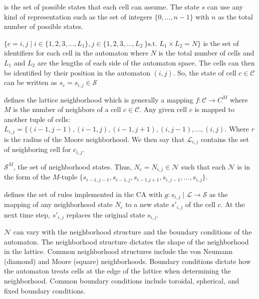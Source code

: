 \begin{CAdef}
    \itemS is the set of possible states that each cell can assume. The state $s$ can use any kind of representation such as the set of integers $\lbrace 0,\ldots,n-1\rbrace$ with $n$ as the total number of possible states.
    
    \itemC $\lbrace c = {i,j} \mid i \in \lbrace 1,2,3,\dots,L_1 \rbrace, j \in \lbrace 1,2,3,\dots,L_2\ \rbrace \text{s.t. } L_1 \times L_2 = N \rbrace$ is the set of identifiers for each cell in the automaton where $N$ is the total number of cells and $L_1$ and $L_2$ are the lengths of each side of the automaton space. The cells can then be identified by their position in the automaton $(i,j)$. So, the state of cell $c \in \mathcal{C}$ can be written as $s_c = s_{i,j} \in \mathcal{S}$
    
    \itemL defines the lattice neighborhood which is generally a mapping $f : \mathcal{C} \rightarrow C^M$ where $M$ is the number of neighbors of a cell $c \in \mathcal{C}$. Any given cell $c$ is mapped to another tuple of cells: $L_{i,j} = \lbrace (i-1,j-1), (i-1, j), (i-1, j+1), (i, j-1), \dots, (i,j)$. Where $r$ is the radius of the Moore neighborhood. We then say that $\mathcal{L}_{i,j}$ contains the set of neighboring cell for $c_{i,j}$.
    
    \itemN $\mathcal{S}^M$, the set of neighborhood states. Thus, $N_c = N_{i,j} \in \mathcal{N}$ such that each $\mathcal{N}$ is in the form of the $M$-tuple $\lbrace s_{i-1,j-1}, s_{i-1, j}, s_{i-1. j+1}, s_{i, j-1}, \dots, s_{i,j} \rbrace$.
    
    \itemR defines the set of rules implemented in the CA with $g : s_{i,j} \mid \mathcal{L} \rightarrow \mathcal{S}$ as the mapping of any neighborhood state $N_c$ to a new state $s'_{i,j}$ of the cell $c$. At the next time step, $s'_{i,j}$ replaces the original state $s_{i,j}$.
\end{CAdef}

$\mathcal{N}$ can vary with the neighborhood structure and the boundary conditions of the automaton. 
The neighborhood structure dictates the shape of the neighborhood in the lattice. 
Common neighborhood structures include the von Neumann (diamond) and Moore (square) neighborhoods. 
Boundary conditions dictate how the automaton treats cells at the edge of the lattice when determining the neighborhood. 
Common boundary conditions include toroidal, spherical, and fixed boundary conditions. 

